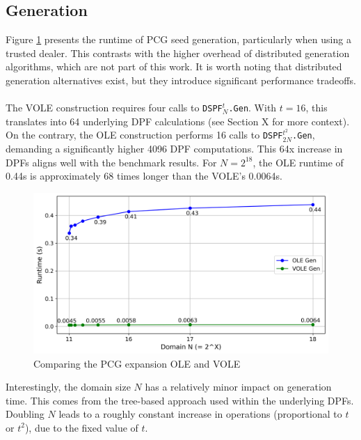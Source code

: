 \subsection{Generation}
\label{subsec:evalGen}
Figure \ref{fig:ComparingPCGGeneration} presents the runtime of PCG seed generation, particularly when using a trusted dealer. This contrasts with the higher overhead of distributed generation algorithms, which are not part of this work. It is worth noting that distributed generation alternatives exist, but they introduce significant performance tradeoffs.
\\\\
The VOLE construction requires four calls to \texttt{DSPF$^{t}_{N}$.Gen}. With $t=16$, this translates into 64 underlying DPF calculations (see Section X for more context). On the contrary, the OLE construction performs 16 calls to \texttt{DSPF$^{t^2}_{2N}$.Gen}, demanding a significantly higher 4096 DPF computations. This 64x increase in DPFs aligns well with the benchmark results. For $N=2^{18}$, the OLE runtime of 0.44s is approximately 68 times longer than the VOLE's 0.0064s. 

\begin{figure}[t]
    \centering
    \includegraphics[scale=0.49]{images/plots/pcg_gen.png}
    \caption{Comparing the PCG expansion OLE and VOLE}
    \label{fig:ComparingPCGGeneration}
\end{figure}

Interestingly, the domain size $N$ has a relatively minor impact on generation time. This comes from the tree-based approach used within the underlying DPFs. Doubling $N$ leads to a roughly constant increase in operations (proportional to $t$ or $t^2$), due to the fixed value of $t$. 


